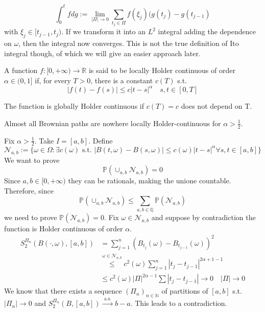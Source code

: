 \documentclass[crop=false, class=article]{standalone}
\begin{document}
\begin{equation*}
	\int_0^t f dg := \lim_{|\Pi| \rightarrow 0} \sum_{t_j \in \Pi} f(\xi_j)(g(t_j) - g(t_{j-1})
\end{equation*}
with $\xi_j \in [t_{j-1}, t_j)$. If we transform it into an $L^2$ integral adding the dependence on $\omega$, then the integral now converges. This is not the true definition of Ito integral though, of which we will give an easier approach later. 
\begin{definition}
	A function $f:[0,+\infty) \rightarrow \mathbb{R}$ is said to be locally Holder continuous of order $\alpha \in (0,1]$ if, for every $T>0$, there is a constant $c(T)$ s.t.
	\begin{equation*}
		|f(t)-f(s)| \leq c|t-s|^\alpha \quad s,t \in [0,T]
	\end{equation*}
\end{definition}
The function is globally Holder continuous if $c(T) = c$ does not depend on T. 
\begin{theorem}
	Almost all Brownian paths are nowhere locally Holder-continuous for $\alpha>\frac{1}{2}$.
\end{theorem}
\begin{fancyproof}
	Fix $\alpha > \frac{1}{2}$. Take $I=[a,b]$. Define 
	\begin{equation*}
		\mathcal{N}_{a,b} := \{\omega \in \Omega: \exists c(\omega) \text{  s.t.  } |B(t,\omega) - B(s,\omega)| \leq c(\omega) |t-s|^\alpha \forall s,t \in [a,b]\}
	\end{equation*}
	We want to prove
	\begin{equation*}
		\mathbb{P}(\cup_{a,b} \mathcal{N}_{a,b}) = 0
	\end{equation*}
	Since $a,b \in [0,+\infty)$ they can be rationals, making the unione countable. Therefore, since
	\begin{equation*}
		\mathbb{P}(\cup_{a,b} \mathcal{N}_{a,b}) \leq \sum_{a,b \in \mathbb{Q}}\mathbb{P}(\mathcal{N}_{a,b})
	\end{equation*}
	we need to prove $\mathbb{P}(\mathcal{N}_{a,b})=0$. Fix $\omega \in \mathcal{N}_{a,b}$ and suppose by contradiction the function is Holder continuous of order $\alpha$. 
	\begin{align*}
		S_2^{\Pi_n}(B(\cdot,\omega), [a,b]) &= \sum_{j=1}^n (B_{t_j}(\omega) - B_{t_{j-1}}(\omega))^2\\
		&\stackrel{\omega \in \mathcal{N}_{a,b}}\leq c^2(\omega) \sum_{j=1}^n |t_j - t_{j-1}|^{2\alpha+1-1} \\
		&\leq c^2(\omega) |\Pi|^{2\alpha -1} \sum|t_j-t_{j-1}| \rightarrow 0 \quad |\Pi| \rightarrow 0 
	\end{align*}
	We know that there exists a sequence $(\Pi_n)_{n \in \mathbb{N}} $ of partitions of $[a,b]$ s.t. $|\Pi_n| \rightarrow 0$ and $S_2^{\Pi_n}(B, [a,b]) \xrightarrow{ \text{ a.s. }} b-a$. This leads to a contradiction. 
\end{fancyproof}
\end{document}
